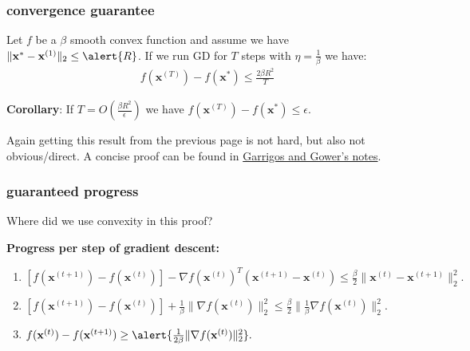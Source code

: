 \documentclass[compress]{beamer}
\newcommand{\bv}[1]{\mathbf{#1}}
\begin{document}
%	
%	


\begin{frame}[t]
	\frametitle{convergence guarantee}
	\begin{theorem}
		Let $f$ be a \alert{$\beta$} smooth convex function and assume we have $\|\bv{x}^{*} - \bv{x}^{(1)}\|_2 \leq \alert{R}$. If we run GD for $T$ steps with $\eta = \frac{1}{\beta}$ we have:
		\begin{align*}
			f(\bv{x}^{(T)}) - f(\bv{x}^*) \leq \frac{2\beta R^2}{T} 
		\end{align*} 
	\end{theorem}
	\textbf{Corollary}: If \alert{$T = O\left(\frac{\beta R^2}{\epsilon}\right)$} we have $f(\bv{x}^{(T)}) - f(\bv{x}^*) \leq \epsilon$.
	
	Again getting this result from the previous page is not hard, but also not obvious/direct. A concise proof can be found in \color{blue} \href{https://gowerrobert.github.io/pdf/M2_statistique_optimisation/grad_conv.pdf}{Garrigos and Gower's notes}.
\end{frame}

\begin{frame}[t]
	\frametitle{guaranteed progress}
	\begin{center}
		Where did we use convexity in this proof?
	\end{center}
	
	\textbf{Progress per step of gradient descent:}
	\begin{enumerate}[1.]
		\item $\left[f(\bv{x}^{(t+1)}) - f(\bv{x}^{(t)})\right] - \nabla f(\bv{x}^{(t)})^T(\bv{x}^{(t+1)} - \bv{x}^{(t)})  \leq \frac{\beta}{2}\|\bv{x}^{(t)} - \bv{x}^{(t+1)}\|_2^2.$\vspace{1.5em}
		\item $\left[f(\bv{x}^{(t+1)}) - f(\bv{x}^{(t)})\right] + 
		\frac{1}{\beta}\|\nabla f(\bv{x}^{(t)})\|_2^2 \leq \frac{\beta}{2}\|\frac{1}{\beta}\nabla f(\bv{x}^{(t)})\|_2^2.$\vspace{1.5em}
		\item $f(\bv{x}^{(t)}) - f(\bv{x}^{(t+1)}) \geq \alert{\frac{1}{2\beta}\|\nabla f(\bv{x}^{(t)})\|_2^2}.$
	\end{enumerate}
\end{frame}
\end{document}
